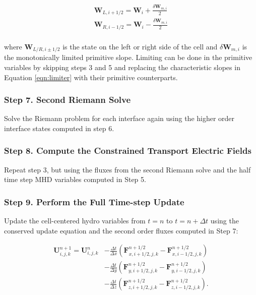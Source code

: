 \documentclass[modern, linenumbers]{aastex631}
\begin{document}
    \begin{equation}
        \begin{aligned}
            \boldsymbol{W}_{L, i+1/2} = \boldsymbol{W}_{i} + \frac{\delta \boldsymbol{W}_{m, i}}{2} \\
            \boldsymbol{W}_{R, i-1/2} = \boldsymbol{W}_{i} - \frac{\delta \boldsymbol{W}_{m, i}}{2} \\
        \end{aligned}
    \end{equation}

    \noindent where $ \boldsymbol{W}_{L/R, i\pm1/2} $ is the state on the left or right side
    of the cell and $ \delta \boldsymbol{W}_{m, i} $ is the monotonically limited
    primitive slope. Limiting can be done in the primitive variables by skipping steps 3 and 5 and replacing the characteristic slopes in Equation \ref{eqn:limiter} with their primitive counterparts.

\subsubsection{Step 7. Second Riemann Solve}
\label{vlct:2nd-riemann-solve}

Solve the Riemann problem for each interface again using the higher order interface states computed in step 6.

\subsubsection{Step 8. Compute the Constrained Transport Electric Fields}
\label{vlct:2nd-emf}

Repeat step 3, but using the fluxes from the second Riemann solve and the half time step MHD variables computed in Step 5.

\subsubsection{Step 9. Perform the Full Time-step Update}
\label{vlct:full-dt-update}

Update the cell-centered hydro variables from $t = n$ to $t = n + \Delta t$ using the conserved update equation and the second order fluxes computed in Step 7:

\begin{equation}
    \begin{aligned}
        \boldsymbol{U}^{n+1}_{i,j,k} = \boldsymbol{U}^{n}_{i,j,k}
        &- \frac{\Delta t}{\Delta x} \left( \boldsymbol{F}^{n+1/2}_{x,i+1/2,j,k} - \boldsymbol{F}^{n+1/2}_{x,i-1/2,j,k} \right) \\
        &- \frac{\Delta t}{\Delta y} \left( \boldsymbol{F}^{n+1/2}_{y,i+1/2,j,k} - \boldsymbol{F}^{n+1/2}_{y,i-1/2,j,k} \right) \\
        &- \frac{\Delta t}{\Delta z} \left( \boldsymbol{F}^{n+1/2}_{z,i+1/2,j,k} - \boldsymbol{F}^{n+1/2}_{z,i-1/2,j,k} \right).
    \end{aligned}
\end{equation}
\end{document}
